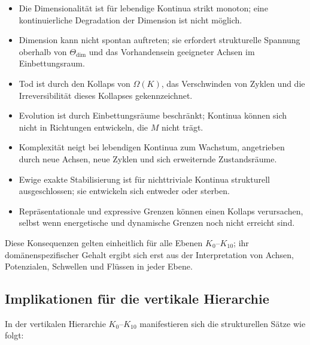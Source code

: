 \begin{itemize}
    \item Die Dimensionalität ist für lebendige Kontinua strikt monoton; eine kontinuierliche Degradation der Dimension ist nicht möglich.
    \item Dimension kann nicht spontan auftreten; sie erfordert strukturelle Spannung oberhalb von \(\Theta_{\mathrm{dim}}\) und das Vorhandensein geeigneter Achsen im Einbettungsraum.
    \item Tod ist durch den Kollaps von \(\Omega(K)\), das Verschwinden von Zyklen und die Irreversibilität dieses Kollapses gekennzeichnet.
    \item Evolution ist durch Einbettungsräume beschränkt; Kontinua können sich nicht in Richtungen entwickeln, die \(M\) nicht trägt.
    \item Komplexität neigt bei lebendigen Kontinua zum Wachstum, angetrieben durch neue Achsen, neue Zyklen und sich erweiternde Zustandsräume.
    \item Ewige exakte Stabilisierung ist für nichttriviale Kontinua strukturell ausgeschlossen; sie entwickeln sich entweder oder sterben.
    \item Repräsentationale und expressive Grenzen können einen Kollaps verursachen, selbst wenn energetische und dynamische Grenzen noch nicht erreicht sind.
\end{itemize}

Diese Konsequenzen gelten einheitlich für alle Ebenen \(K_0\)–\(K_{10}\); ihr domänenspezifischer Gehalt ergibt sich erst aus der Interpretation von Achsen, Potenzialen, Schwellen und Flüssen in jeder Ebene.

\subsection{Implikationen für die vertikale Hierarchie}

In der vertikalen Hierarchie \(K_0\)–\(K_{10}\) manifestieren sich die strukturellen Sätze wie folgt:

